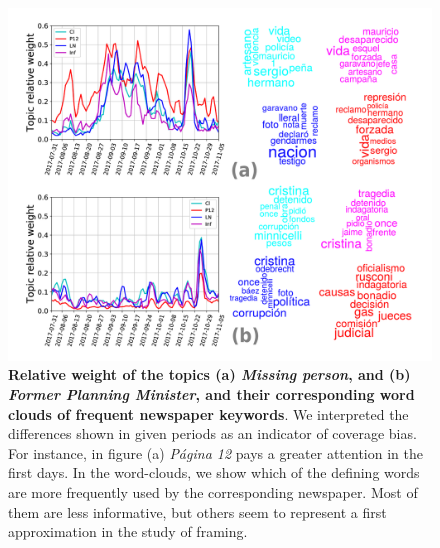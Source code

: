 \documentclass{bmcart}
\begin{document}
\begin{backmatter}
\begin{figure}[h!]
\includegraphics[width = \textwidth]{Fig7.pdf}
\caption{\textbf{Relative weight of the topics (a) \textit{Missing person}, and (b) \textit{Former Planning Minister}, and their corresponding word clouds of frequent newspaper keywords}. We interpreted the differences shown in given periods as an indicator of coverage bias. For instance, in figure (a) \emph{P\'agina 12} pays a greater attention in the first days. In the word-clouds, we show which of the defining words are more frequently used by the corresponding newspaper. Most of them are less informative, but others seem to represent a first approximation in the study of framing.}
\label{fig:topics_temporal_profiles}
\end{figure}


\end{backmatter}
\end{document}
